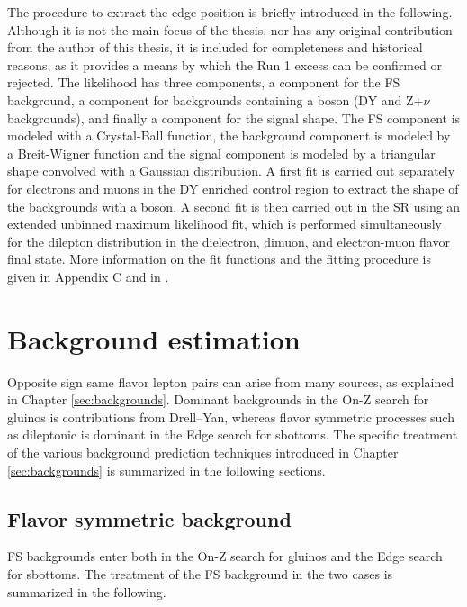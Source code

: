 The procedure to extract the edge position is briefly introduced in the following. 
Although it is not the main focus of the thesis, nor has any original contribution from the author of this thesis, it is included for completeness and historical reasons, as it provides a means by which the Run 1 excess can be confirmed or rejected.   
\newpara
\noindent\justify
The likelihood has three components, a component for the FS background, a component for backgrounds containing a \PZ boson (DY and Z+$\nu$ backgrounds), and finally a component for the signal shape.
The FS component is modeled with a Crystal-Ball function, the \PZ background component is modeled by a Breit-Wigner function and the signal component is modeled by a triangular shape convolved with a Gaussian distribution. 
A first fit is carried out separately for electrons and muons in the DY enriched control region to extract the shape of the backgrounds with a \PZ boson. 
A second fit is then carried out in the SR using an extended unbinned maximum likelihood fit, which is performed simultaneously for the dilepton \mll distribution in the dielectron, dimuon, and electron-muon flavor final state. 
More information on the fit functions and the fitting procedure is given in Appendix C and in \cite{Sirunyan:2017qaj}.  
\section{Background estimation}
\noindent
\justify
Opposite sign same flavor lepton pairs can arise from many sources, as explained in Chapter \ref{sec:backgrounds}. 
Dominant backgrounds in the On-Z search for gluinos is contributions from Drell--Yan, whereas flavor symmetric processes such as dileptonic \ttbar is dominant in the Edge search for sbottoms. 
The specific treatment of the various background prediction techniques introduced in Chapter \ref{sec:backgrounds} is summarized in the following sections. 
\subsection*{Flavor symmetric background}\label{sec:fsstrong}
\noindent\justify
FS backgrounds enter both in the On-Z search for gluinos and the Edge search for sbottoms. The treatment of the FS background in the two cases is summarized in the following. 
